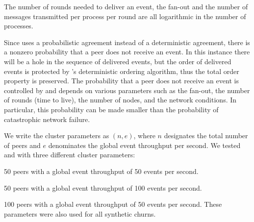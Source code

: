 The number of rounds needed to deliver an event, the fan-out and the number of messages transmitted per process per round are all logarithmic in the number of processes. \autocite{matos2015epto}
\par
Since \epto uses a probabilistic agreement instead of a deterministic agreement, there is a nonzero probability that a peer does not receive an event. In this instance there will be a hole in the sequence of delivered events, but the order of delivered events is protected by \epto's deterministic ordering algorithm, thus the total order property is preserved. The probability that a peer does not receive an event is controlled by \epto and depends on various parameters such as the fan-out, the number of rounds (time to live), the number of nodes, and the network conditions. In particular, this probability can be made smaller than the probability of catastrophic network failure. %
\par
We write the cluster parameters as $(n,e)$, where $n$ designates the total number of peers and $e$ denominates the global event throughput per second. We tested \epto and \jgroups with three different cluster parameters:
\begin{description}[\IEEEsetlabelwidth{$(100,100)$:}]
	\item[\textbf{$(50,50)$}:] 50 peers with a global event throughput of 50 events per second.
	\item[\textbf{$(50,100)$}:] 50 peers with a global event throughput of 100 events per second.
	\item[\textbf{$(100,50)$}:] 100 peers with a global event throughput of 50 events per second. These parameters were also used for all synthetic churns.
\end{description}
